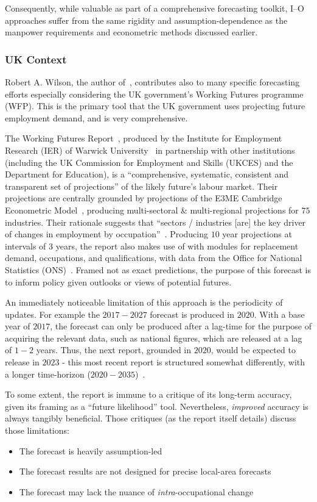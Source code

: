 Consequently, while valuable as part of a comprehensive forecasting toolkit, I--O approaches suffer from the same rigidity and assumption-dependence as the manpower requirements and econometric methods discussed earlier.

\subsubsection{UK Context}

Robert A. Wilson, the author of~\cite{wilson_2001_ForecastingSkill}, contributes also to many specific forecasting efforts especially considering the UK government's Working Futures programme (WFP).
This is the primary tool that the UK government uses projecting future employment demand, and is very comprehensive.

The Working Futures Report~\cite{warwick134235}, produced by the Institute for Employment Research (IER) of Warwick University~\cite{__IERWorking} in partnership with other institutions (including the UK Commission for Employment and Skills (UKCES) and the Department for Education),
is a ``comprehensive, systematic, consistent and transparent set of projections'' of the likely future's labour market.
Their projections are centrally grounded by projections of the E3ME Cambridge Econometric Model~\cite{_2024_E3MECambridge}, producing multi-sectoral \& multi-regional projections for $75$ industries.
Their rationale suggests that ``sectors / industries [are] the key driver of changes in employment by occupation''~\cite{warwick134235}.
Producing $10$ year projections at intervals of $3$ years, the report also makes use of with modules for replacement demand, occupations, and qualifications, with data from the Office for National Statistics (ONS)~\cite{__HomeOffice}.
Framed not as exact predictions, the purpose of this forecast is to inform policy given outlooks or views of potential futures.

An immediately noticeable limitation of this approach is the periodicity of updates.
For example the $2017-2027$ forecast is produced in $2020$. With a base year of $2017$, the forecast can only be produced after a lag-time for the purpose of acquiring the relevant data, such as national figures, which are released at a lag of $1-2$ years.
Thus, the next report, grounded in $2020$, would be expected to release in $2023$ - this most recent report is structured somewhat differently, with a longer time-horizon ($2020-2035$)~\cite{__LabourMarketa}.

To some extent, the report is immune to a critique of its long-term accuracy, given its framing as a ``future likelihood'' tool. Nevertheless, \emph{improved} accuracy is always tangibly beneficial.
Those critiques (as the report itself details) discuss those limitations:
\begin{itemize}
  \item The forecast is heavily assumption-led
  \item The forecast results are not designed for precise local-area forecasts
  \item The forecast may lack the nuance of \emph{intra}-occupational change
\end{itemize}

